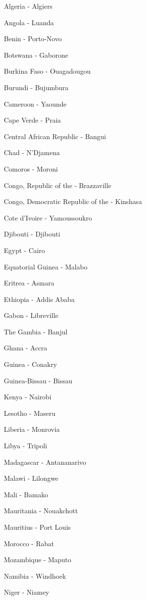 \documentclass[12pt]{article}
\begin{document}
\begin{multicols}{3}
\tiny\begin{enumerate*}
\item Algeria - Algiers
\item Angola - Luanda
\item Benin - Porto-Novo
\item Botswana - Gaborone
\item Burkina Faso - Ouagadougou
\item Burundi - Bujumbura
\item Cameroon - Yaounde
\item Cape Verde - Praia
\item Central African Republic - Bangui
\item Chad - N'Djamena
\item Comoros - Moroni
\item Congo, Republic of the - Brazzaville
\item Congo, Democratic Republic of the - Kinshasa
\item Cote d'Ivoire - Yamoussoukro
\item Djibouti - Djibouti
\item Egypt - Cairo
\item Equatorial Guinea - Malabo
\item Eritrea - Asmara
\item Ethiopia - Addis Ababa
\item Gabon - Libreville
\item The Gambia - Banjul
\item Ghana - Accra
\item Guinea - Conakry
\item Guinea-Bissau - Bissau
\item Kenya - Nairobi
\item Lesotho - Maseru
\item Liberia - Monrovia
\item Libya - Tripoli
\item Madagascar - Antananarivo
\item Malawi - Lilongwe
\item Mali - Bamako
\item Mauritania - Nouakchott
\item Mauritius - Port Louis
\item Morocco - Rabat
\item Mozambique - Maputo
\item Namibia - Windhoek
\item Niger - Niamey

\end{enumerate*}
\end{multicols}
\end{document}
